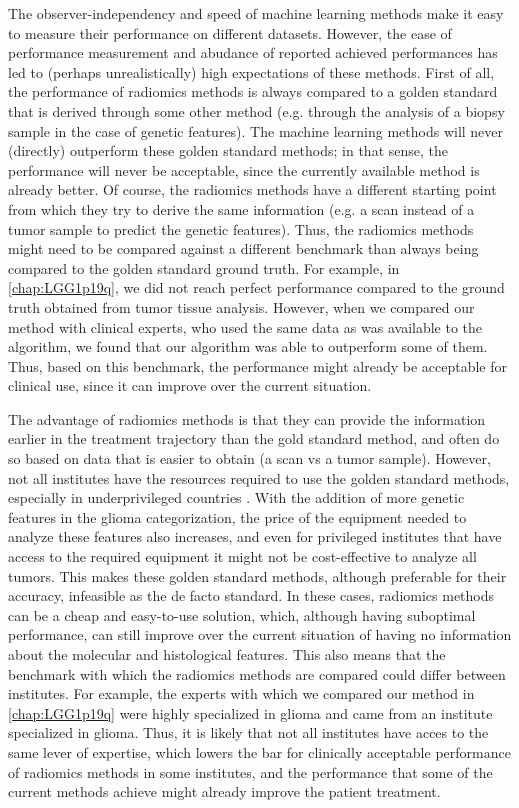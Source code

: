 The observer-independency and speed of machine learning methods make it easy to measure their performance on different datasets.
However, the ease of performance measurement and abudance of reported achieved performances has led to (perhaps unrealistically) high expectations of these methods.
First of all, the performance of radiomics methods is always compared to a golden standard that is derived through some other method (e.g. through the analysis of a biopsy sample in the case of genetic features).
The machine learning methods will never (directly) outperform these golden standard methods; in that sense, the performance will never be acceptable, since the currently available method is already better.
Of course, the radiomics methods have a different starting point from which they try to derive the same information (e.g. a scan instead of a tumor sample to predict the genetic features).
Thus, the radiomics methods might need to be compared against a different benchmark than always being compared to the golden standard ground truth.
For example, in \cref{chap:LGG1p19q}, we did not reach perfect performance compared to the ground truth obtained from tumor tissue analysis.
However, when we compared our method with clinical experts, who used the same data as was available to the algorithm, we found that our algorithm was able to outperform some of them.
Thus, based on this benchmark, the performance might already be acceptable for clinical use, since it can improve over the current situation.

The advantage of radiomics methods is that they can provide the information earlier in the treatment trajectory than the gold standard method, and often do so based on data that is easier to obtain (a scan vs a tumor sample).
However, not all institutes have the resources required to use the golden standard methods, especially in underprivileged countries \autocite{santosh2019india}.
With the addition of more genetic features in the glioma categorization, the price of the equipment needed to analyze these features also increases, and even for privileged institutes that have access to the required equipment it might not be cost-effective to analyze all \glspl{tumor}\autocite{malzkorn2016practical,dewitt2017costIDH}.
This makes these golden standard methods, although preferable for their accuracy, infeasible as the de facto standard.
In these cases, radiomics methods can be a cheap and easy-to-use solution, which, although having suboptimal performance, can still improve over the current situation of having no information about the molecular and histological features.
This also means that the benchmark with which the radiomics methods are compared could differ between institutes.
For example, the experts with which we compared our method in \cref{chap:LGG1p19q} were highly specialized in glioma and came from an institute specialized in glioma.
Thus, it is likely that not all institutes have acces to the same lever of expertise, which lowers the bar for clinically acceptable performance of radiomics methods in some institutes, and the performance that some of the current methods achieve might already improve the patient treatment.

